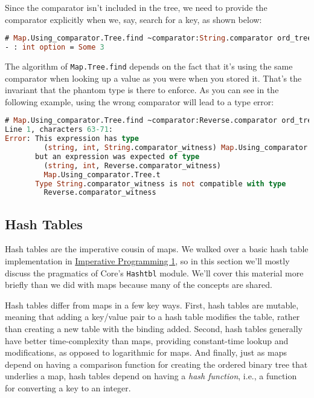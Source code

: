 Since the comparator isn't included in the tree, we need to provide the
comparator explicitly when we, say, search for a key, as shown below:

\begin{lstlisting}[language=Caml]
# Map.Using_comparator.Tree.find ~comparator:String.comparator ord_tree "snoo"
- : int option = Some 3
\end{lstlisting}

The algorithm of \passthrough{\lstinline!Map.Tree.find!} depends on the
fact that it's using the same comparator when looking up a value as you
were when you stored it. That's the invariant that the phantom type is
there to enforce. As you can see in the following example, using the
wrong comparator will lead to a type error:

\begin{lstlisting}[language=Caml]
# Map.Using_comparator.Tree.find ~comparator:Reverse.comparator ord_tree "snoo"
Line 1, characters 63-71:
Error: This expression has type
         (string, int, String.comparator_witness) Map.Using_comparator.Tree.t
       but an expression was expected of type
         (string, int, Reverse.comparator_witness)
         Map.Using_comparator.Tree.t
       Type String.comparator_witness is not compatible with type
         Reverse.comparator_witness
\end{lstlisting}

\hypertarget{hash-tables}{%
\subsection{Hash Tables}\label{hash-tables}}

Hash tables are the imperative cousin of maps. We walked over a basic
hash table implementation in
\href{imperative-programming.html\#imperative-programming-1}{Imperative
Programming 1}, so in this section we'll mostly discuss the pragmatics
of Core's \passthrough{\lstinline!Hashtbl!} module. We'll cover this
material more briefly than we did with maps because many of the concepts
are shared. 

Hash tables differ from maps in a few key ways. First, hash tables are
mutable, meaning that adding a key/value pair to a hash table modifies
the table, rather than creating a new table with the binding added.
Second, hash tables generally have better time-complexity than maps,
providing constant-time lookup and modifications, as opposed to
logarithmic for maps. And finally, just as maps depend on having a
comparison function for creating the ordered binary tree that underlies
a map, hash tables depend on having a \emph{hash function}, i.e., a
function for converting a key to an integer.

